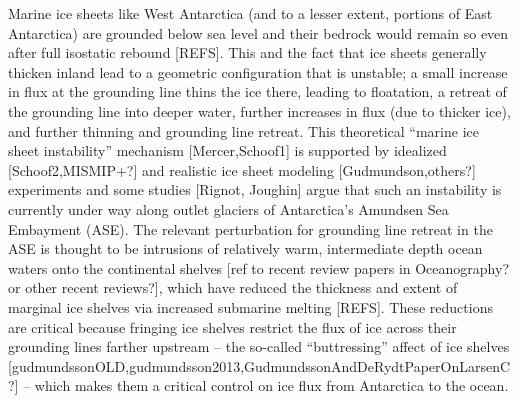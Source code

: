 \documentclass[review,oneside]{igs}
\begin{document}
Marine ice sheets like West Antarctica (and to a lesser extent, portions of East Antarctica) are grounded below sea level and their bedrock would remain so even after full isostatic rebound [REFS]. This and the fact that ice sheets generally thicken inland lead to a geometric configuration that is unstable; a small increase in flux at the grounding line thins the ice there, leading to floatation, a retreat of the grounding line into deeper water, further increases in flux (due to thicker ice), and further thinning and grounding line retreat. This theoretical ``marine ice sheet instability'' mechanism [Mercer,Schoof1] is supported by idealized [Schoof2,MISMIP+?] and realistic ice sheet modeling [Gudmundson,others?] experiments and some studies [Rignot, Joughin] argue that such an instability is currently under way along outlet glaciers of Antarctica's Amundsen Sea Embayment (ASE). The relevant perturbation for grounding line retreat in the ASE is thought to be intrusions of relatively warm, intermediate depth ocean waters onto the continental shelves [ref to recent review papers in Oceanography? or other recent reviews?], which have reduced the thickness and extent of marginal ice shelves via increased submarine melting [REFS]. These reductions are critical because fringing ice shelves restrict the flux of ice across their grounding lines farther upstream -- the so-called ``buttressing'' affect of ice shelves [gudmundssonOLD,gudmundsson2013,GudmundssonAndDeRydtPaperOnLarsenC?] -- which makes them a critical control on ice flux from Antarctica to the ocean.

\end{document}
